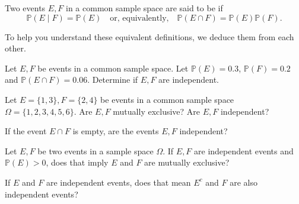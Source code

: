 \documentclass[../main.tex]{subfiles}
\begin{document}

\begin{definition} \label{def:independence}
  Two events \(E,F\) in a common sample space are said to be  if 
  \begin{equation} \label{eq:probability-independence}
    \mathbb{P}(E \mid F) = \mathbb{P}(E)
    \quad\text{or, equivalently,}\quad
    \mathbb{P}(E \cap F) = \mathbb{P}(E) \mathbb{P}(F).
  \end{equation}
\end{definition}

To help you understand these equivalent definitions, we deduce them from each other.


\begin{example} \label{ex:independence-check}
  Let \(E, F\) be events in a common sample space. Let \(\mathbb{P}(E) = 0.3\), \(\mathbb{P}(F) = 0.2\) and \(\mathbb{P}(E \cap F) = 0.06\).   Determine if \(E,F\) are independent.

  \blanks*
\end{example}
\clearpage

\begin{example} \label{ex:independence-vs-exclusive}
  Let \(E = \{1,3\}, F = \{2,4\}\) be events in a common sample space \(\Omega = \{1,2,3,4,5,6\}\).  Are \(E,F\) mutually exclusive? Are \(E,F\) independent?

\end{example}

\begin{exercise} \label{ex:independence-empty-intersection}
  If the event \(E \cap F\) is empty, are the events \(E,F\) independent?

\end{exercise}

\begin{exercise} \label{ex:independence-implies-exclusive}
  Let \(E,F\) be two events in a sample space \(\Omega\). If \(E,F\) are independent events and \(\mathbb{P}(E) > 0\), does that imply \(E\) and \(F\) are mutually exclusive?

\end{exercise}

\begin{exercise} \label{ex:independence-complement}
  If \(E\) and \(F\) are independent events, does that mean \(E^{c}\) and \(F\) are also independent events?

\end{exercise}
\end{document}
